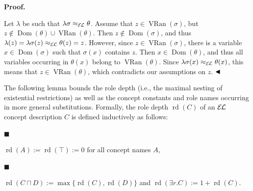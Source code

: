 \documentclass[10pt,a4paper]{amsart}
\begin{document}
 
 
 
\par\medskip\noindent\textbf{Proof.}\par
 
 
Let $\lambda$ be such that $\lambda\sigma\approx_{\mathcal{E\mkern-1.618muL}}\theta$. Assume that $z\in\operatorname{VRan}(\sigma)$, but $z\notin\operatorname{Dom}(\theta)\cup\operatorname{VRan}(\theta)$. Then $z\not\in\operatorname{Dom}(\sigma)$, and thus $\lambda(z)=\lambda\sigma(z)\approx_{\mathcal{E\mkern-1.618muL}}\theta(z)=z$. However, since $z\in\operatorname{VRan}(\sigma)$, there is a variable $x\in\operatorname{Dom}(\sigma)$ such that $\sigma(x)$ contains $z$. Then $x\in\operatorname{Dom}(\theta)$, and thus all variables occurring in $\theta(x)$ belong to $\operatorname{VRan}(\theta)$. Since $\lambda\sigma(x)\approx_{\mathcal{E\mkern-1.618muL}}\theta(x)$, this means that $z\in\operatorname{VRan}(\theta)$, which contradicts our assumptions on $z$. $\hfill\blacktriangleleft$\par
 
 
 
The following lemma bounds the role depth (i.e., the maximal nesting of existential restrictions) as well as the concept constants and role names occurring in more general substitutions. Formally, the role depth $\operatorname{rd}(C)$ of an $\mathcal{E\mkern-1.618muL}$ concept description $C$ is defined inductively as follows:\par
  
\par\noindent  $\blacksquare$ 
 
$\operatorname{rd}(A):=\operatorname{rd}(\top):=0$ for all concept names $A$,\par
 
 
 
\par\noindent  $\blacksquare$ 
 
$\operatorname{rd}(C\sqcap D):=\max\{\operatorname{rd}(C),\operatorname{rd}(D)\}$ and $\operatorname{rd}(\exists r.C):=1+\operatorname{rd}(C)$.\par
 
 
\end{document}
